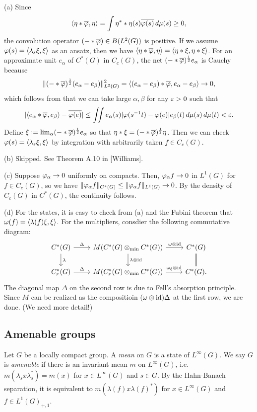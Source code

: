 \documentclass{../../small}
\begin{document}
\begin{pf}
(a)
Since
\[\langle\eta*\overline{\varphi},\eta\rangle=\int\eta^**\eta(s)\overline{\varphi(s)}\,d\mu(s)\ge0,\]
the convolution operator $(-*\overline{\varphi})\in B(L^2(G))$ is positive.
If we assume $\varphi(s)=\langle\lambda_s\xi,\xi\rangle$ as an ansatz, then we have $\langle\eta*\overline{\varphi},\eta\rangle=\langle\eta*\xi,\eta*\xi\rangle$.
For an approximate unit $e_\alpha$ of $C^*(G)$ in $C_c(G)$, the net $(-*\overline{\varphi})^{\frac12}e_\alpha$ is Cauchy because
\[\|(-*\overline{\varphi})^{\frac12}(e_\alpha-e_\beta)\|_{L^2(G)}^2=\langle(e_\alpha-e_\beta)*\overline{\varphi},e_\alpha-e_\beta\rangle\to0,\]
which follows from that we can take large $\alpha,\beta$ for any $\varepsilon>0$ such that
\[|\langle e_\alpha*\overline{\varphi},e_\beta\rangle-\overline{\varphi(e)}|\le\iint e_\alpha(s)|\varphi(s^{-1}t)-\varphi(e)|e_\beta(t)\,d\mu(s)\,d\mu(t)<\varepsilon.\]
Define $\xi:=\lim_\alpha(-*\overline{\varphi})^{\frac12}e_\alpha$ so that $\eta*\xi=(-*\overline{\varphi})^{\frac12}\eta$.
Then we can check $\varphi(s)=\langle\lambda_s\xi,\xi\rangle$ by integration with arbitrarily taken $f\in C_c(G)$.

(b)
Skipped.
See Theorem A.10 in [Williams].

(c)
Suppose $\varphi_\alpha\to0$ uniformly on compacts.
Then, $\varphi_\alpha f\to0$ in $L^1(G)$ for $f\in C_c(G)$, so we have $\|\varphi_\alpha f\|_{C^*(G)}\le\|\varphi_\alpha f\|_{L^1(G)}\to0$.
By the density of $C_c(G)$ in $C^*(G)$, the continuity follows.

(d)
For the states, it is easy to check from (a) and the Fubini theorem that $\omega(f)=\langle\lambda(f)\xi,\xi\rangle$.
For the multipliers, consdier the following commutative diagram:
\[\begin{tikzcd}
C^*(G) \ar{r}{\Delta}\ar{d}{\lambda} & M(C^*(G)\otimes_{\min}C^*(G)) \ar{r}{\omega\otimes\id}\ar{d}{\lambda\otimes\id} & C^*(G) \ar[equals]{d}\\
C_r^*(G) \ar{r}{\Delta} & M(C_r^*(G)\otimes_{\min}C^*(G)) \ar{r}{\omega_\xi\otimes\id} & C^*(G).
\end{tikzcd}\]
The diagonal map $\Delta$ on the second row is due to Fell's absorption principle.
Since $M$ can be realized as the compositioin $(\omega\otimes\operatorname{id})\Delta$ at the first row, we are done. (We need more detail!)
\end{pf}



\subsection{Amenable groups}
\begin{defn}
Let $G$ be a locally compact group.
A \emph{mean} on $G$ is a state of $L^\infty(G)$.
We say $G$ is \emph{amenable} if there is an invariant mean $m$ on $L^\infty(G)$, i.e.~$m(\lambda_sx\lambda_s^*)=m(x)$ for $x\in L^\infty(G)$ and $s\in G$.
By the Hahn-Banach separation, it is equivalent to $m(\lambda(f)x\lambda(f)^*)$ for $x\in L^\infty(G)$ and $f\in L^1(G)_{+,1}$.
\end{defn}
\end{document}
